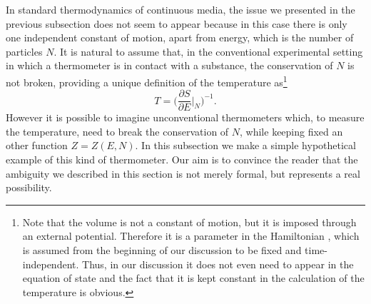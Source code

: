 \documentclass[twocolumn,usenatbib]{mnras2}
\begin{document}
In standard thermodynamics of continuous media, the issue we presented in the previous subsection does not seem to appear because in this case there is only one independent constant of motion, apart from energy, which is the number of particles $N$. It is natural to assume that, in the conventional experimental setting in which a thermometer is in contact with a substance, the conservation of $N$ is not broken, providing a unique definition of the temperature as\footnote{Note that the volume is not a constant of motion, but it is imposed through an external potential. Therefore it is a parameter in the Hamiltonian \citep{landau5}, which is assumed from the beginning of our discussion to be fixed and time-independent. Thus, in our discussion it does not even need to appear in the equation of state and the fact that it is kept constant in the calculation of the temperature is obvious.} 
\begin{equation}
T = \bigg( \dfrac{\partial S}{\partial E} \bigg|_N \bigg)^{-1} .
\end{equation}
However it is possible to imagine unconventional thermometers which, to measure the temperature, need to break the conservation of $N$, while keeping fixed an other function $Z=Z(E,N)$. In this subsection we make a simple hypothetical example of this kind of thermometer. Our aim is to convince the reader that the ambiguity we described in this section is not merely formal, but represents a real possibility.

\end{document}
